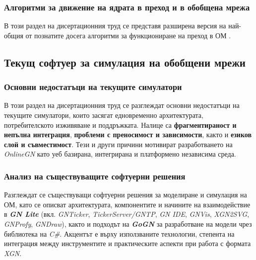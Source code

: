 \subsubsection[Алгоритми за движение на ядрата в преход и в обобщена мрежа]{Алгоритми за движение на ядрата в преход и в обобщена мрежа}\label{tokenMove}

\hspace*{2.5em}В този раздел на дисертационния труд се представя разширена версия на най-общия от познатите досега алгоритми за функциониране на преход в ОМ \cite{DIS-Z1, DIS-Z3, DIS-BAM, DIS-AtanassovSotirova2017}.

\subsection{Текущ софтуер за симулация на обобщени мрежи}

\subsubsection{Основни недостатъци на текущите симулатори}

\hspace*{2.5em}В този раздел на дисертационния труд се разглеждат основни недостатъци на текущите симулатори, които засягат едновременно архитектурата, потребителското изживяване и поддръжката. Налице са \textbf{фрагментираност и непълна интеграция}, \textbf{проблеми с преносимост и зависимости}, както и \textbf{езиков слой и съвместимост}. Тези и други причини мотивират разработването на \textit{OnlineGN} като уеб базирана, интегрирана и платформено независима среда.

\subsubsection{Анализ на съществуващите софтуерни решения}

\hspace*{2.5em}Разглеждат се съществуващи софтуерни решения за моделиране и симулация на ОМ, като се описват архитектурата, компонентите и начините на взаимодействие в \textbf{\textit{GN Lite}} (вкл. \textit{GNTicker}, \textit{TickerServer/GNTP}, \textit{GN IDE}, \textit{GNVis}, \textit{XGN2SVG}, \textit{GNProfy}, \textit{GNDraw}), както и подходът на \textbf{\textit{GoGN}} за разработване на модели чрез библиотека на \textit{C\#}. Акцентът е върху използваните технологии, степента на интеграция между инструментите и практическите аспекти при работа с формата \textit{XGN}.

